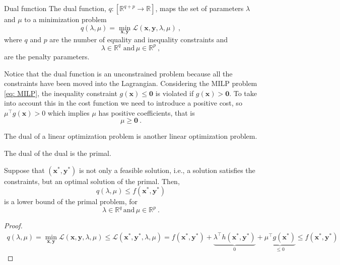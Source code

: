 \begin{definition}{Dual function}{}
The dual function, $q: \left[\mathbb{R}^{q+p}\rightarrow\mathbb{R}\right]$, maps the set of parameters $\lambda$ and $\mu$ to a minimization problem
\begin{equation}
    q(\lambda, \mu) = \min_{\mathbf{x}, \mathbf{y}}\mathcal{L}(\mathbf{x},\mathbf{y}, \lambda, \mu)\ ,
\end{equation}
where $q$ and $p$ are the number of equality and inequality constraints and
\begin{equation}
    \lambda\in\mathbb{R}^{q}\,\, \textrm{and}\, \mu\in\mathbb{R}^{p}\ ,
\end{equation}
are the penalty parameters.
\end{definition}
Notice that the dual function is an unconstrained problem because all the constraints have been moved into the Lagrangian.
Considering the MILP problem \eqref{eq: MILP}, the inequality constraint $g(\mathbf{x})\leq \mathbf{0}$ is violated if $g(\mathbf{x})>\mathbf{0}$. To take into account this in the cost function we need to introduce a positive cost, so $\mu^{\intercal}g(\mathbf{x})>0$ which implies $\mu$ has positive coefficients, that is
\begin{equation}
    \mu \geq \mathbf{0}\ .
\end{equation}
\begin{theorem}{}{}
The dual of a linear optimization problem is another linear optimization problem.
\end{theorem}
\begin{theorem}{}{}
The dual of the dual is the primal.
\end{theorem}
\begin{theorem}{}{}
Suppose that $(\mathbf{x}^{*}, \mathbf{y}^{*})$ is not only a feasible solution, i.e., a solution satisfies the constraints, but an optimal solution of the primal. Then,
\begin{equation}
    q(\lambda, \mu) \leq f(\mathbf{x}^{*},\mathbf{y}^{*})
\end{equation}
is a lower bound of the primal problem, for
\begin{equation}
    \lambda\in\mathbb{R}^{q}\, \textrm{and}\, \mu\in\mathbb{R}^{p}\ .
\end{equation}
\end{theorem}
\begin{proof}
\begin{align}
    q(\lambda, \mu) = \min_{\mathbf{x}, \mathbf{y}} \mathcal{L}(\mathbf{x}, \mathbf{y}, \lambda, \mu) \leq \mathcal{L}(\mathbf{x}^{*}, \mathbf{y}^{*}, \lambda, \mu) = f(\mathbf{x}^{*}, \mathbf{y}^{*}) + \underbrace{\lambda^{\intercal}h(\mathbf{x}^{*}, \mathbf{y}^{*})}_{0} + \underbrace{\mu^{\intercal}g(\mathbf{x}^{*})}_{\leq 0} \leq f(\mathbf{x}^{*}, \mathbf{y}^{*})
\end{align}
\end{proof}
